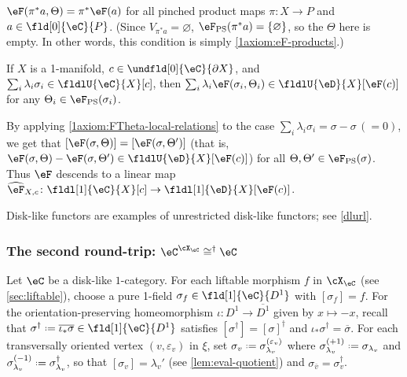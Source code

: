 \documentclass[12pt,reqno]{amsart}
\newcommand{\C}{\eC}
\newcommand{\D}{\eD}
\newcommand{\fcj}[1]{\overline{#1}}
\newcommand{\orev}{\overline}
\DeclareRobustCommand{\coloneq}{\mathrel{\vcenter{\baselineskip0.5ex\lineskiplimit0pt\hbox{\scriptsize{\upshape.}}\hbox{\scriptsize{\upshape.}}}}=}
\begin{document}
\begin{definition}
\begin{lst}
  \item[(F$\Theta\pi$)]
  \label{1axiom:FTheta-products} $\eF(\pi^*a,\Theta)=\pi^*\eF(a)$ for all pinched product maps $\pi\colon X\to P$ and $a\in\fld[0]{\C}{P}$. (Since $V_{\pi^*a}=\varnothing$, $\eF_{\mathrm{PS}}(\pi^*a)=\{\varnothing\}$, so the $\Theta$ here is empty. In other words, this condition is simply \ref{1axiom:eF-products}.)
  \item[(F$\Theta$U)]\label{1axiom:FTheta-local-relations} If $X$ is a 1-manifold, $c\in\undfld[0]{\C}{\partial X}$, and $\sum_i\lambda_i\sigma_i\in\fldlU{\C}{X}[c]$, then $\sum_i\lambda_i\eF(\sigma_i,\Theta_i)\in\fldlU{\D}{X}[\eF(c)]$ for any $\Theta_i\in\eF_{\mathrm{PS}}(\sigma_i)$.
\end{lst}
\end{definition}

\begin{remark}
\label{1dldldl}
By applying \ref{1axiom:FTheta-local-relations} to the case $\sum_i\lambda_i\sigma_i=\sigma-\sigma\,(=0)$, we get that  $[\eF(\sigma,\Theta)]=[\eF(\sigma,\Theta^\prime)]$ (that is, $\eF(\sigma,\Theta)-\eF(\sigma,\Theta^\prime)\in\fldlU{\D}{X}[\eF(c)]$) for all $\Theta,\Theta^\prime\in\eF_{\mathrm{PS}}(\sigma)$. Thus $\eF$ descends to a linear map $\widehat\eF_{X,c}\colon\fldl[1]{\C}{X}[c]\to\fldl[1]{\D}{X}[\eF(c)]$.
\end{remark}

Disk-like functors are examples of unrestricted disk-like functors; see \cref{dlurl}.





\subsubsection{The second round-trip: \texorpdfstring{$\eC^{\cX_\eC}\cong^\dag\eC$}{C(X(C)) = C}}
Let $\C$ be a disk-like $1$-category. For each liftable morphism $f$ in $\cX_\C$ (see \cref{sec:liftable}), choose a pure 1-field $\sigma_f\in\fld[1]{\C}{D^1}$ with $[\sigma_f]=f$. For the orientation-preserving homeomorphism $\iota\colon D^1\to\orev{D^1}$ given by $x\mapsto -x$, recall that $\sigma^\dag\coloneq\fcj{\iota_*\sigma}\in\fld[1]{\C}{D^1}$ satisfies $[\sigma^\dag]=[\sigma]^\dag$ and $\iota_*\sigma^\dag=\fcj\sigma$. For each transversally oriented vertex $(v,\varepsilon_v)$ in $\xi$, set $\sigma_v\coloneq\sigma_{\lambda_v}^{(\varepsilon_v)}$ where $\sigma_{\lambda_v}^{(+1)}\coloneq\sigma_{\lambda_v}$ and $\sigma_{\lambda_v}^{(-1)}\coloneq\sigma_{\lambda_v}^\dag$, so that $[\sigma_v]=\lambda_v'$ (see \cref{lem:eval-quotient}) and $\sigma_{\orev v}=\sigma_v^\dag$. 
\end{document}
